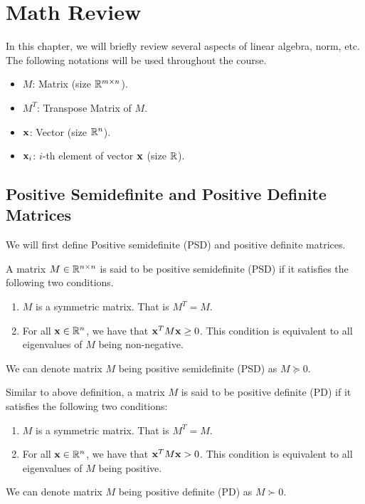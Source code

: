 \documentclass[../main.tex]{subfiles}
\begin{document}
\chapter{Math Review}

In this chapter, we will briefly review several aspects of linear algebra, norm, etc. The following notations will be used throughout the course.

\begin{itemize}
	\item $M$: Matrix (size $\mathbb{R}^{m \times n}$).
	\item $M^T$: Transpose Matrix of $M$.
	\item $\mathbf{x}$: Vector (size $\mathbb{R}^n$).
	\item $\mathbf{x}_i$: $i$-th element of vector $\mathbf{x}$ (size $\mathbb{R}$).
\end{itemize}

\section{Positive Semidefinite and Positive Definite Matrices}
We will first define Positive semidefinite (PSD) and positive definite matrices.

\begin{definition}
	
	A matrix $M\in \mathbb{R}^{n\times n}$ is said to be positive semidefinite (PSD) if it satisfies the following two conditions.
	
	\begin{enumerate}
		\item $M$ is a symmetric matrix. That is $M^T = M$.
		\item For all $\mathbf{x} \in \mathbb{R}^n$, we have that $\mathbf{x}^T M \mathbf{x} \geq 0$. This condition is equivalent to all eigenvalues of $M$ being non-negative.
	\end{enumerate}

	We can denote matrix $M$ being positive semidefinite (PSD) as $M \succeq 0$.
\end{definition}

\begin{definition}
	Similar to above definition, a matrix $M$ is said to be positive definite (PD) if it satisfies the following two conditions:
	
	\begin{enumerate}
		\item $M$ is a symmetric matrix. That is $M^T = M$.
		\item For all $\mathbf{x} \in \mathbb{R}^n$, we have that $\mathbf{x}^T M \mathbf{x} > 0$. This condition is equivalent to all eigenvalues of $M$ being positive.
	\end{enumerate}

	We can denote matrix $M$ being positive definite (PD) as $M \succ 0$.
\end{definition}
\end{document}
